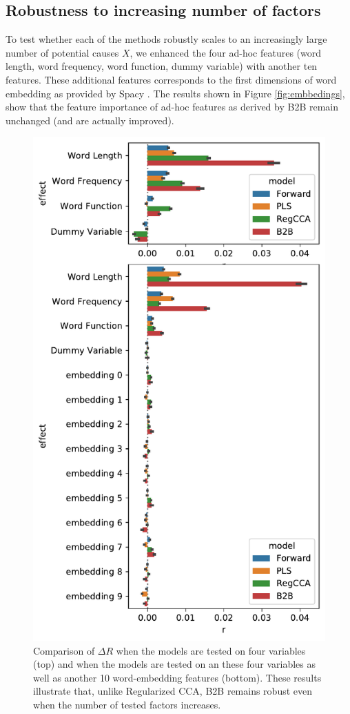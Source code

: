 \subsection{Robustness to increasing number of factors}

To test whether each of the methods robustly scales to an increasingly large number of potential causes $X$, we enhanced the four ad-hoc features (word length, word frequency, word function, dummy variable) with another ten features. These additional features corresponds to the first dimensions of word embedding as provided by Spacy \citep{spacy2}. The results shown in Figure \ref{fig:embbedings}, show that the feature importance of ad-hoc features as derived by B2B remain unchanged (and are actually improved).

\begin{figure}
  \centering
  \includegraphics[width=0.5\linewidth]{figures/compare_embeddings.pdf}
  \caption{Comparison of $\Delta R$ when the models are tested on four variables (top) and when the models are tested on an these four variables as well as another 10 word-embedding features (bottom). These results illustrate that, unlike Regularized CCA, B2B remains robust even when the number of tested factors increases.
  \label{fig:embeddings}}
\end{figure}
